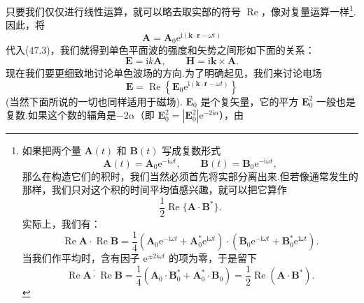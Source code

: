 只要我们仅仅进行线性运算，就可以略去取实部的符号 $\operatorname{Re}$，像对复量运算一样\footnote{如果把两个量 $\boldsymbol{A}(t)$ 和 $\boldsymbol{B}(t)$ 写成复数形式
\begin{equation*}
  \boldsymbol{A}(t)=\boldsymbol{A}_0\mathrm{e}^{-\mathrm{i}\omega t},\qquad
  \boldsymbol{B}(t)=\boldsymbol{B}_0\mathrm{e}^{-\mathrm{i}\omega t},
\end{equation*}
那么在构造它们的积时，我们当然必须首先将实部分离出来.但若像通常发生的那样，我们只对这个积的时间平均值感兴趣，就可以把它算作
\begin{equation*}
  \frac{1}{2}\operatorname{Re}\{\boldsymbol{A}\cdot\boldsymbol{B}^*\}.
\end{equation*}
实际上，我们有：
\begin{equation*}
  \operatorname{Re}\boldsymbol{A}\cdot\operatorname{Re}\boldsymbol{B}
  =\frac{1}{4}\left(\boldsymbol{A}_0\mathrm{e}^{-\mathrm{i}\omega t}
  +\boldsymbol{A}_0^*\mathrm{e}^{\mathrm{i}\omega t}\right)
  \cdot\left(\boldsymbol{B}_0\mathrm{e}^{-\mathrm{i}\omega t}
  +\boldsymbol{B}_0^*\mathrm{e}^{\mathrm{i}\omega t}\right).
\end{equation*}
当我们作平均时，含有因子 $\mathrm{e}^{\pm 2\mathrm{i}\omega t}$ 的项为零，于是留下
\begin{equation*}
  \overline{\operatorname{Re}\boldsymbol{A}\cdot\operatorname{Re}\boldsymbol{B}}
  =\frac{1}{4}\left(\boldsymbol{A}_0\cdot\boldsymbol{B}_0^*
  +\boldsymbol{A}_0^*\cdot\boldsymbol{B}_0\right)
  =\frac{1}{2}\operatorname{Re}\left(\boldsymbol{A}\cdot\boldsymbol{B}^*\right).
\end{equation*}}.因此，将
\begin{equation*}
  \boldsymbol{A}=\boldsymbol{A}_0\mathrm{e}^{\mathrm{i}(\boldsymbol{k}\cdot\boldsymbol{r}-\omega t)}
\end{equation*}
代入(47.3)，我们就得到单色平面波的强度和矢势之间形如下面的关系：
\begin{equation}
  \boldsymbol{E}=\mathrm{i}k\boldsymbol{A},\qquad
  \boldsymbol{H}=\mathrm{i}\boldsymbol{k}\times\boldsymbol{A}.
\end{equation}
现在我们要更细致地讨论单色波场的方向.为了明确起见，我们来讨论电场
\begin{equation*}
  \boldsymbol{E}=\operatorname{Re}\left\{\boldsymbol{E}_0
  \mathrm{e}^{\mathrm{i}(\boldsymbol{k}\cdot\boldsymbol{r}-\omega t)}\right\}
\end{equation*}
(当然下面所说的一切也同样适用于磁场). $\boldsymbol{E}_0$ 是个复矢量，它的平方 $\boldsymbol{E}_0^2$ 一般也是复数.如果这个数的辐角是$-2\alpha$（即 $\boldsymbol{E}_0^2 = |\boldsymbol{E}_0^2|\mathrm{e}^{-2\mathrm{i}\alpha}$），由
